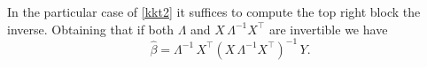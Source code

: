 \documentclass[12pt,letterpaper]{article}
\begin{document}
In the particular case of \eqref{kkt2} it suffices to compute the top right block the inverse. Obtaining that if both $\Lambda$ and $X\,\Lambda^{-1}X^\top$ are invertible we have 
\begin{equation}
    \hat \beta = \Lambda^{-1}\,X^\top(X\,\Lambda^{-1}X^\top)^{-1}\,Y. 
\end{equation}

\end{document}

